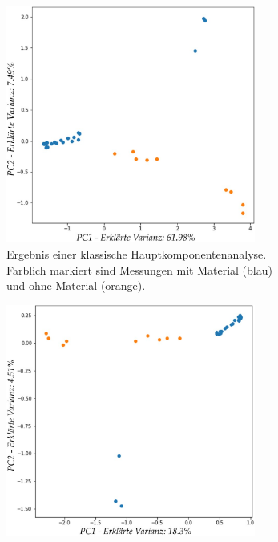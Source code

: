 \begin{figure}
\centering
\begin{subfigure}{0.45\textwidth}
\centering
\includegraphics[width = 0.9\textwidth]{figures/Signal_5_pc_graph.jpg}
\caption{Ergebnis einer klassische Hauptkomponentenanalyse. Farblich markiert sind Messungen mit Material (blau) und ohne Material (orange).}
\label{sparse_pca_classical_analysis_pc_graph}
\end{subfigure}
\vspace{0.25cm}
%
\begin{subfigure}{0.45\textwidth}
\centering
\includegraphics[width = 0.9\textwidth]{figures/Signal_5_sparse_pc_graph.jpg}

\end{subfigure}
\end{figure}
